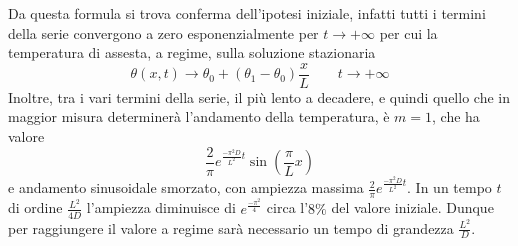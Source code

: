 \documentclass[a4paper,12pt, draft]{article}
\theoremstyle{break}
\numberwithin{equation}{section}
\begin{document}
Da questa formula si trova conferma dell'ipotesi iniziale, infatti tutti i termini della serie convergono a zero esponenzialmente per $t \to +\infty$ per cui la temperatura di assesta, a regime, sulla soluzione stazionaria
$$
\theta(x,t) \to \theta_0 + (\theta_1 - \theta_0) \frac{x}{L} \qquad t \to + \infty
$$
Inoltre, tra i vari termini della serie, il più lento a decadere, e quindi quello che in maggior misura determinerà l'andamento della temperatura, è $m = 1$, che ha valore
$$
\frac{2}{\pi}e^{\frac{-\pi^2 D}{L^2}t}\sin{\left(\frac{\pi}{L}x\right)}
$$
e andamento sinusoidale smorzato, con ampiezza massima $\frac{2}{\pi} e^{\frac{-\pi^2 D}{L^2}t}$. In un tempo $t$ di ordine $\frac{L^2}{4D}$ l'ampiezza diminuisce di $e^{\frac{-\pi^2}{4}}$ circa l'$8\%$ del valore iniziale. Dunque per raggiungere il valore a regime sarà necessario un tempo di grandezza $\frac{L^2}{D}$.
\end{document}
